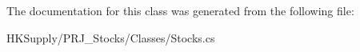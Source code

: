 The documentation for this class was generated from the following file\+:\begin{DoxyCompactItemize}
\item 
H\+K\+Supply/\+P\+R\+J\+\_\+\+Stocks/\+Classes/Stocks.\+cs\end{DoxyCompactItemize}
